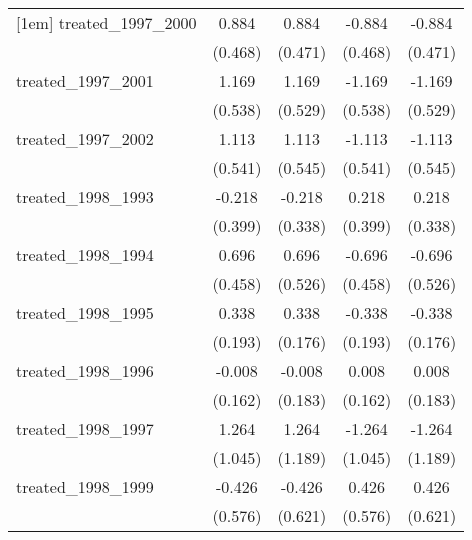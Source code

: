 {\begin{tabular}{l*{4}{c}}
[1em]
treated\_1997\_2000&       0.884         &       0.884         &      -0.884         &      -0.884         \\
            &     (0.468)         &     (0.471)         &     (0.468)         &     (0.471)         \\
[1em]
treated\_1997\_2001&       1.169\sym{*}  &       1.169\sym{*}  &      -1.169\sym{*}  &      -1.169\sym{*}  \\
            &     (0.538)         &     (0.529)         &     (0.538)         &     (0.529)         \\
[1em]
treated\_1997\_2002&       1.113\sym{*}  &       1.113\sym{*}  &      -1.113\sym{*}  &      -1.113\sym{*}  \\
            &     (0.541)         &     (0.545)         &     (0.541)         &     (0.545)         \\
[1em]
treated\_1998\_1993&      -0.218         &      -0.218         &       0.218         &       0.218         \\
            &     (0.399)         &     (0.338)         &     (0.399)         &     (0.338)         \\
[1em]
treated\_1998\_1994&       0.696         &       0.696         &      -0.696         &      -0.696         \\
            &     (0.458)         &     (0.526)         &     (0.458)         &     (0.526)         \\
[1em]
treated\_1998\_1995&       0.338         &       0.338         &      -0.338         &      -0.338         \\
            &     (0.193)         &     (0.176)         &     (0.193)         &     (0.176)         \\
[1em]
treated\_1998\_1996&      -0.008         &      -0.008         &       0.008         &       0.008         \\
            &     (0.162)         &     (0.183)         &     (0.162)         &     (0.183)         \\
[1em]
treated\_1998\_1997&       1.264         &       1.264         &      -1.264         &      -1.264         \\
            &     (1.045)         &     (1.189)         &     (1.045)         &     (1.189)         \\
[1em]
treated\_1998\_1999&      -0.426         &      -0.426         &       0.426         &       0.426         \\
            &     (0.576)         &     (0.621)         &     (0.576)         &     (0.621)         \\

\end{tabular}}
